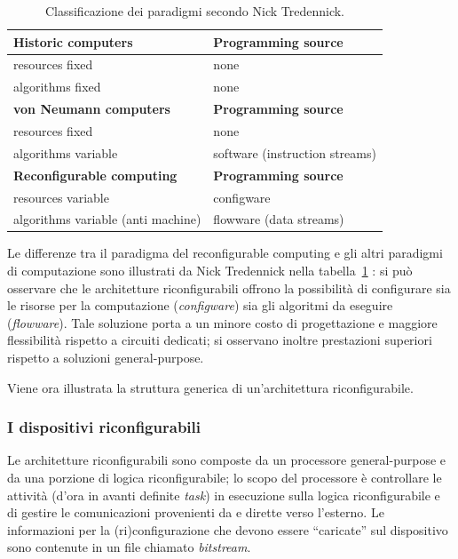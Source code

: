 \begin{table}[ht]
\begin{center}
 \begin{tabular}{l | l}
 \hline
 \textbf{Historic computers} & \textbf{Programming source}\\
 \hline
 resources fixed & none\\
 algorithms fixed & none\\
 \hline
 \textbf{von Neumann computers} & \textbf{Programming source}\\
 \hline
 resources fixed & none\\
 algorithms variable & software (instruction streams)\\
 \hline
 \textbf{Reconfigurable computing} & \textbf{Programming source}\\
 \hline
 resources variable & configware\\
 algorithms variable (anti machine) & flowware (data streams)
 \end{tabular}
 \caption{Classificazione dei paradigmi secondo Nick Tredennick.}
 \label{tab:TredennickClassificationScheme}
 \end{center}
\end{table}

Le differenze tra il paradigma del reconfigurable computing e gli altri paradigmi di
computazione sono illustrati da Nick Tredennick nella
tabella~\ref{tab:TredennickClassificationScheme} \cite{TredennickClassification}: si può
osservare che le architetture riconfigurabili offrono la possibilità di configurare sia le
risorse per la computazione (\emph{configware}) sia gli algoritmi da eseguire
(\emph{flowware}). Tale soluzione porta a un minore costo di progettazione e
maggiore flessibilità rispetto a circuiti dedicati; si osservano inoltre prestazioni
superiori rispetto a soluzioni general-purpose.

Viene ora illustrata la struttura generica di un'architettura riconfigurabile.

\subsubsection{I dispositivi riconfigurabili}
Le architetture riconfigurabili sono composte da un processore general-purpose e da una
porzione di logica riconfigurabile; lo scopo del processore è controllare le
attività (d'ora in avanti definite \emph{task}) in esecuzione sulla logica
riconfigurabile e di gestire le comunicazioni provenienti da e dirette verso l'esterno.
Le informazioni per la (ri)configurazione che devono essere ``caricate'' sul dispositivo
sono contenute in un file chiamato \emph{bitstream}.

